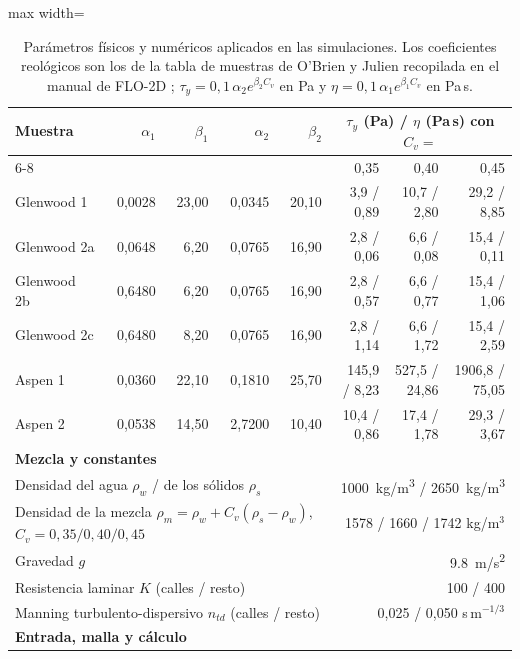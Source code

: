 \begin{table}[htbp]\centering\small
\caption{Parámetros físicos y numéricos aplicados en las simulaciones. Los coeficientes reológicos son los de la tabla de muestras de O'Brien y Julien recopilada en el manual de FLO-2D \citep{flo2d2021}; $\tau_y=0{,}1\,\alpha_2e^{\beta_2C_v}$ en Pa y $\eta=0{,}1\,\alpha_1e^{\beta_1C_v}$ en Pa\,s.}\label{tab:parametros}
\begin{adjustbox}{max width=\textwidth}\begin{tabular}{lrrrrrrr}\toprule
Muestra & $\alpha_1$ & $\beta_1$ & $\alpha_2$ & $\beta_2$ & \multicolumn{3}{c}{$\tau_y$ (Pa) / $\eta$ (Pa\,s) con $C_v=$}\\\cmidrule(l){6-8}
 & & & & & 0,35 & 0,40 & 0,45\\\midrule
Glenwood 1 & 0{,}0028 & 23{,}00 & 0{,}0345 & 20{,}10 & 3{,}9 / 0{,}89 & 10{,}7 / 2{,}80 & 29{,}2 / 8{,}85\\
Glenwood 2a & 0{,}0648 & 6{,}20 & 0{,}0765 & 16{,}90 & 2{,}8 / 0{,}06 & 6{,}6 / 0{,}08 & 15{,}4 / 0{,}11\\
Glenwood 2b & 0{,}6480 & 6{,}20 & 0{,}0765 & 16{,}90 & 2{,}8 / 0{,}57 & 6{,}6 / 0{,}77 & 15{,}4 / 1{,}06\\
Glenwood 2c & 0{,}6480 & 8{,}20 & 0{,}0765 & 16{,}90 & 2{,}8 / 1{,}14 & 6{,}6 / 1{,}72 & 15{,}4 / 2{,}59\\
Aspen 1 & 0{,}0360 & 22{,}10 & 0{,}1810 & 25{,}70 & 145{,}9 / 8{,}23 & 527{,}5 / 24{,}86 & 1906{,}8 / 75{,}05\\
Aspen 2 & 0{,}0538 & 14{,}50 & 2{,}7200 & 10{,}40 & 10{,}4 / 0{,}86 & 17{,}4 / 1{,}78 & 29{,}3 / 3{,}67\\
\midrule
\multicolumn{8}{l}{\textbf{Mezcla y constantes}}\\
\multicolumn{5}{l}{Densidad del agua $\rho_w$ / de los sólidos $\rho_s$} & \multicolumn{3}{r}{\SI{1000}{kg/m^3} / \SI{2650}{kg/m^3}}\\
\multicolumn{5}{l}{Densidad de la mezcla $\rho_m=\rho_w+C_v(\rho_s-\rho_w)$, $C_v=0{,}35/0{,}40/0{,}45$} & \multicolumn{3}{r}{1578 / 1660 / 1742 kg/m$^3$}\\
\multicolumn{5}{l}{Gravedad $g$} & \multicolumn{3}{r}{\SI{9,8}{m/s^2}}\\
\multicolumn{5}{l}{Resistencia laminar $K$ (calles / resto)} & \multicolumn{3}{r}{100 / 400}\\
\multicolumn{5}{l}{Manning turbulento-dispersivo $n_{td}$ (calles / resto)} & \multicolumn{3}{r}{0,025 / 0,050 s\,m$^{-1/3}$}\\
\multicolumn{8}{l}{\textbf{Entrada, malla y cálculo}}\\

\end{tabular}
\end{adjustbox}
\end{table}
